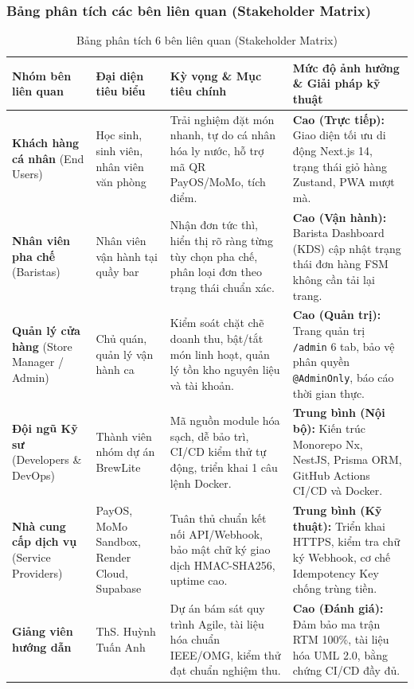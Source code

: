 \documentclass[11pt,a4paper]{article}
\begin{document}
\subsubsection{Bảng phân tích các bên liên quan (Stakeholder Matrix)}

\begin{table}[H]
\centering
\small
\renewcommand{\arraystretch}{0.92}
\begin{tabularx}{\linewidth}{|p{3.2cm}|p{2.6cm}|p{3.8cm}|Y|}
\hline
{}
\textbf{Nhóm bên liên quan} & \textbf{Đại diện tiêu biểu} & \textbf{Kỳ vọng \& Mục tiêu chính} & \textbf{Mức độ ảnh hưởng \& Giải pháp kỹ thuật} \\ \hline
\textbf{Khách hàng cá nhân} \newline (End Users) & Học sinh, sinh viên, nhân viên văn phòng & Trải nghiệm đặt món nhanh, tự do cá nhân hóa ly nước, hỗ trợ mã QR PayOS/MoMo, tích điểm. & \textbf{Cao (Trực tiếp):} Giao diện tối ưu di động Next.js 14, trạng thái giỏ hàng Zustand, PWA mượt mà. \\ \hline
\textbf{Nhân viên pha chế} \newline (Baristas) & Nhân viên vận hành tại quầy bar & Nhận đơn tức thì, hiển thị rõ ràng từng tùy chọn pha chế, phân loại đơn theo trạng thái chuẩn xác. & \textbf{Cao (Vận hành):} Barista Dashboard (KDS) cập nhật trạng thái đơn hàng FSM không cần tải lại trang. \\ \hline
\textbf{Quản lý cửa hàng} \newline (Store Manager / Admin) & Chủ quán, quản lý vận hành ca & Kiểm soát chặt chẽ doanh thu, bật/tắt món linh hoạt, quản lý tồn kho nguyên liệu và tài khoản. & \textbf{Cao (Quản trị):} Trang quản trị \texttt{/admin} 6 tab, bảo vệ phân quyền \texttt{@AdminOnly}, báo cáo thời gian thực. \\ \hline
\textbf{Đội ngũ Kỹ sư} \newline (Developers \& DevOps) & Thành viên nhóm dự án BrewLite & Mã nguồn module hóa sạch, dễ bảo trì, CI/CD kiểm thử tự động, triển khai 1 câu lệnh Docker. & \textbf{Trung bình (Nội bộ):} Kiến trúc Monorepo Nx, NestJS, Prisma ORM, GitHub Actions CI/CD và Docker. \\ \hline
\textbf{Nhà cung cấp dịch vụ} \newline (Service Providers) & PayOS, MoMo Sandbox, Render Cloud, Supabase & Tuân thủ chuẩn kết nối API/Webhook, bảo mật chữ ký giao dịch HMAC-SHA256, uptime cao. & \textbf{Trung bình (Kỹ thuật):} Triển khai HTTPS, kiểm tra chữ ký Webhook, cơ chế Idempotency Key chống trùng tiền. \\ \hline
\textbf{Giảng viên hướng dẫn} & ThS. Huỳnh Tuấn Anh & Dự án bám sát quy trình Agile, tài liệu hóa chuẩn IEEE/OMG, kiểm thử đạt chuẩn nghiệm thu. & \textbf{Cao (Đánh giá):} Đảm bảo ma trận RTM 100\%, tài liệu hóa UML 2.0, bằng chứng CI/CD đầy đủ. \\ \hline
\end{tabularx}
\caption{Bảng phân tích 6 bên liên quan (Stakeholder Matrix)}
\label{tab:stakeholder}
\end{table}
\end{document}
